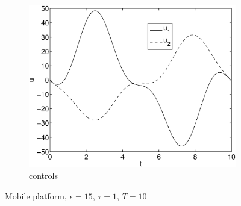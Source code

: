\begin{figure}[h]
\begin{subfigure}[b]{\textwidth}
\centering
\includegraphics[height=0.3\textheight]{img/final_1_15_10_u.eps}
\caption{controls}
\end{subfigure}
\caption{Mobile platform, $\epsilon=15$, $\tau=1$, $T=10$}
\label{fig:pl5}
\end{figure}

